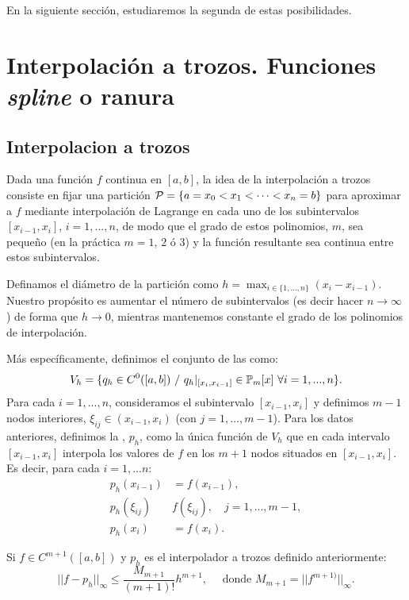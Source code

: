  En la siguiente sección, estudiaremos la segunda de estas
 posibilidades.

 \section{Interpolación a trozos. Funciones \textit{spline} o ranura}
 \label{sec:interp-trozos-splines}

 \subsection{Interpolacion a trozos}
 \label{sec:interpolacion-trozos}


 Dada una función $f$ continua en $[a,b]$, la idea de la interpolación
 a trozos consiste en fijar una partición ${\cal
   P}=\{a=x_0<x_1<\cdots<x_n=b\}$ para aproximar a $f$ mediante
 interpolación de Lagrange en cada uno de los subintervalos
 $[x_{i-1},x_{i}]$, $i=1,...,n$, de modo que el grado de estos
 polinomios, $m$, sea pequeño (en la práctica $m=1$, $2$ ó $3$) y la
 función resultante sea continua entre estos subintervalos.

 Definamos el diámetro de la partición como
 $h=\max_{i\in\{1,...,n\}}(x_i-x_{i-1})$. Nuestro propósito es aumentar
 el número de subintervalos (es decir hacer $n\to \infty$) de forma
 que $h\to 0$, mientras mantenemos constante el grado de los polinomios
 de interpolación.

 Más específicamente, definimos el conjunto de las  como:
 \begin{equation*}
   V_h = \{ q_h\in C^0([a,b]) \ /\ q_h|_{[x_i,x_{i-1}]}\in \Pol_m[x]\
   \forall i=1,...,n \}.
 \end{equation*}
 Para cada $i=1,...,n$, consideramos el subintervalo $[x_{i-1},x_i]$ y
 definimos $m-1$ nodos interiores, $\xi_{ij}\in (x_{i-1},x_i)$ (con
 $j=1,\dots,m-1$). Para los datos anteriores, definimos la
 , $p_h$, como
 la única función de $V_h$ que en cada intervalo $[x_{i-1},x_i]$
 interpola los valores de $f$ en los $m+1$ nodos situados en $[x_{i-1},
 x_{i}]$.  Es decir, para cada $i=1,\dots n$:
 \begin{align*}
   p_h(x_{i-1})&=f(x_{i-1}),\\
   p_h(\xi_{ij})&f(\xi_{ij}), \quad j=1,...,m-1,\\
   p_h(x_i)&=f(x_i).
 \end{align*}

 \begin{theorem}
   \label{thm:interpol-trozos-error}
   Si $f\in C^{m+1}( [a,b])$ y $p_h$ es el interpolador a trozos
   definido anteriormente:
   \begin{equation}
     ||f-p_h||_\infty\le\frac{M_{m+1}}{(m+1)!}h^{m+1},
     \quad
     \text{ donde } M_{m+1}=||f^{m+1)}||_\infty.
     \label{eq:interpol-trozos-error}
   \end{equation}
 \end{theorem}

